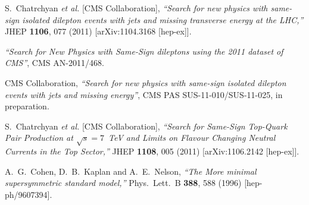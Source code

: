 \begin{thebibliography}{99}

  S.~Chatrchyan {\it et al.}  [CMS Collaboration],
  {\it ``Search for new physics with same-sign isolated dilepton 
	events with jets and missing transverse energy at the LHC,''}
  JHEP {\bf 1106}, 077 (2011)
  [arXiv:1104.3168 [hep-ex]].

 {{\it ``Search for New Physics with Same-Sign dileptons using the 2011 dataset of CMS''}}, 
  CMS AN-2011/468.

 CMS Collaboration, {{\it ``Search for new physics with same-sign isolated 
	dilepton events with jets and missing energy''}}, 
  CMS PAS SUS-11-010/SUS-11-025, in preparation.

  S.~Chatrchyan {\it et al.}  [CMS Collaboration],
  {\it ``Search for Same-Sign Top-Quark Pair Production at $\sqrt{s} = 7$~TeV 
	and Limits on Flavour Changing Neutral Currents in the Top Sector,''}
  JHEP {\bf 1108}, 005 (2011)
  [arXiv:1106.2142 [hep-ex]].















  A.~G.~Cohen, D.~B.~Kaplan and A.~E.~Nelson,
  {\it ``The More minimal supersymmetric standard model,''}
  Phys.\ Lett.\ B {\bf 388}, 588 (1996)
  [hep-ph/9607394].



\end{thebibliography}
